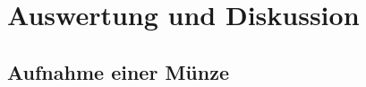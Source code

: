 
\chapter{Auswertung und Diskussion}
\label{chap:versuchsauswertung}

\section{Aufnahme einer Münze}